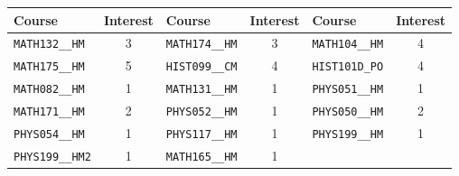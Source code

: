 \begin{tabular}{|p{}|c||p{}|c||p{}|c|}
    \hline
    Course & Interest & Course & Interest & Course & Interest\\\hline
    \verb|MATH132__HM| & 3&
    \verb|MATH174__HM| & 3&
    \verb|MATH104__HM| & 4\\
    \verb|MATH175__HM| & 5&
    \verb|HIST099__CM| & 4&
    \verb|HIST101D_PO| & 4\\
    \verb|MATH082__HM| & 1&
    \verb|MATH131__HM| & 1&
    \verb|PHYS051__HM| & 1\\
    \verb|MATH171__HM| & 2&
    \verb|PHYS052__HM| & 1&
    \verb|PHYS050__HM| & 2\\
    \verb|PHYS054__HM| & 1&
    \verb|PHYS117__HM| & 1&
    \verb|PHYS199__HM| & 1\\
    \verb|PHYS199__HM2| & 1&
    \verb|MATH165__HM| & 1&&\\
    \hline
\end{tabular}